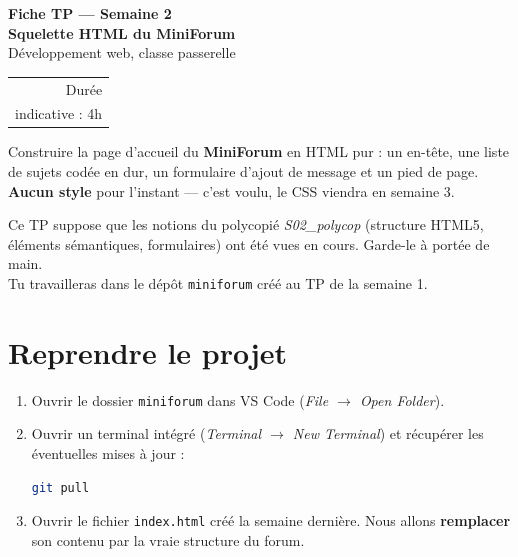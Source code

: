 \documentclass[a4paper,11pt]{article}
\begin{document}

\begin{tcolorbox}[
  colback=accentBlue, colframe=accentBlue,
  arc=4pt, left=12pt, right=12pt, top=10pt, bottom=10pt]
  \begin{minipage}{0.72\linewidth}
    {\color{white}\Large\bfseries Fiche TP --- Semaine 2}\\[4pt]
    {\color{white}\Large\bfseries Squelette HTML du MiniForum}\\[4pt]
    {\color{lightBlue}\normalsize Développement web, classe passerelle}
  \end{minipage}
  \hfill
  \begin{minipage}{0.22\linewidth}
    \raggedleft
    \begin{tabular}{r}
      \color{lightBlue}\small Durée \\
      \color{white}\small indicative : 4h \\
    \end{tabular}
  \end{minipage}
\end{tcolorbox}

\vspace{6pt}
\begin{tcolorbox}[definition, title={Objectif du TP}]
Construire la page d'accueil du \textbf{MiniForum} en HTML pur : un en-tête, une liste de sujets codée en dur, un formulaire d'ajout de message et un pied de page. \textbf{Aucun style} pour l'instant --- c'est voulu, le CSS viendra en semaine 3.
\end{tcolorbox}

\begin{tcolorbox}[astuce, title={Avant de commencer}]
Ce TP suppose que les notions du polycopié \textit{S02\_polycop} (structure HTML5, éléments sémantiques, formulaires) ont été vues en cours. Garde-le à portée de main.\\
Tu travailleras dans le dépôt \texttt{miniforum} créé au TP de la semaine 1.
\end{tcolorbox}

\section{Reprendre le projet}

\begin{enumerate}
  \item Ouvrir le dossier \texttt{miniforum} dans VS Code (\textit{File $\rightarrow$ Open Folder}).
  \item Ouvrir un terminal intégré (\textit{Terminal $\rightarrow$ New Terminal}) et récupérer les éventuelles mises à jour :
\begin{lstlisting}[language=bash]
git pull
\end{lstlisting}
  \item Ouvrir le fichier \texttt{index.html} créé la semaine dernière. Nous allons \textbf{remplacer} son contenu par la vraie structure du forum.
\end{enumerate}
\end{document}
